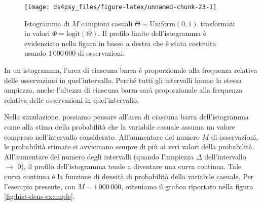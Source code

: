 \documentclass[
  11pt,
]{krantz}
\theoremstyle{definition}
\theoremstyle{definition}
\theoremstyle{definition}
\theoremstyle{definition}
\theoremstyle{remark}
\begin{document}
\begin{figure}[h]

{\centering \texttt{[image: ds4psy\_files/figure-latex/unnamed-chunk-23-1]} 

}

\caption{Istogramma di $M$ campioni casuali $\Theta \sim \mbox{Uniform}(0, 1)$ trasformati in valori $\Phi = \mbox{logit}(\Theta).$ Il profilo limite dell'istogramma è evidenziato nella figura in basso a destra che è stata costruita usando $1\,000\,000$ di osservazioni.}\label{fig:unnamed-chunk-23}
\end{figure}

In un istogramma, l'area di ciascuna barra è proporzionale alla frequenza relativa delle osservazioni in quel'intervallo. Perché tutti gli intervalli hanno la stessa ampiezza, anche l'altezza di ciascuna barra sarà proporzionale alla frequenza relativa delle osservazioni in quel'intervallo.

Nella simulazione, possiamo pensare all'area di ciascuna barra dell'istogramma come alla stima della probabilità che la variabile casuale assuma un valore compreso nell'intervallo considerato. All'aumentare del numero \(M\) di osservazioni, le probabilità stimate si avvicinano sempre di più ai veri valori della probabilità. All'aumentare del numero degli intervalli (quando l'ampiezza \(\Delta\) dell'intervallo \(\rightarrow\) 0), il profilo dell'istogramma tende a diventare una curva continua. Tale curva continua è la funzione di densità di probabilità della variabile casuale. Per l'esempio presente, con \(M =1\,000\,000\), otteniamo il grafico riportato nella figura \ref{fig:hist-dens-example}.
\end{document}
